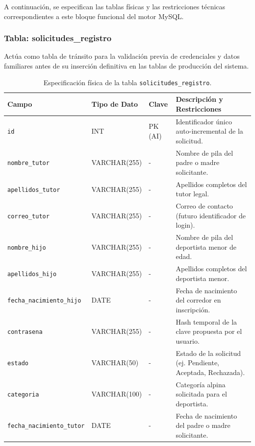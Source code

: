         A continuación, se especifican las tablas físicas y las restricciones técnicas correspondientes a este bloque funcional del motor MySQL.

        \subsubsection{Tabla: solicitudes\_registro}
        Actúa como tabla de tránsito para la validación previa de credenciales y datos familiares antes de su inserción definitiva en las tablas de producción del sistema.

        \begin{table}[htbp]
        \centering
        \scriptsize
        \renewcommand{\arraystretch}{0.9}
        \setlength{\tabcolsep}{4pt}
        \begin{tabularx}{\textwidth}{|l|l|l|X|}
        \hline
        \rowcolor[HTML]{EFEFEF} 
        \textbf{Campo} & \textbf{Tipo de Dato} & \textbf{Clave} & \textbf{Descripción y Restricciones} \\ \hline
        \texttt{id} & INT & PK (AI) & Identificador único auto-incremental de la solicitud. \\ \hline
        \texttt{nombre\_tutor} & VARCHAR(255) & - & Nombre de pila del padre o madre solicitante. \\ \hline
        \texttt{apellidos\_tutor} & VARCHAR(255) & - & Apellidos completos del tutor legal. \\ \hline
        \texttt{correo\_tutor} & VARCHAR(255) & - & Correo de contacto (futuro identificador de login). \\ \hline
        \texttt{nombre\_hijo} & VARCHAR(255) & - & Nombre de pila del deportista menor de edad. \\ \hline
        \texttt{apellidos\_hijo} & VARCHAR(255) & - & Apellidos completos del deportista menor. \\ \hline
        \texttt{fecha\_nacimiento\_hijo} & DATE & - & Fecha de nacimiento del corredor en inscripción. \\ \hline
        \texttt{contrasena} & VARCHAR(255) & - & Hash temporal de la clave propuesta por el usuario. \\ \hline
        \texttt{estado} & VARCHAR(50) & - & Estado de la solicitud (ej. Pendiente, Aceptada, Rechazada). \\ \hline
        \texttt{categoria} & VARCHAR(100) & - & Categoría alpina solicitada para el deportista. \\ \hline
        \texttt{fecha\_nacimiento\_tutor} & DATE & - & Fecha de nacimiento del padre o madre solicitante. \\ \hline
        \end{tabularx}
        \caption{Especificación física de la tabla \texttt{solicitudes\_registro}.}
        \label{tab:dic_solicitudes_registro}
        \end{table}
        
